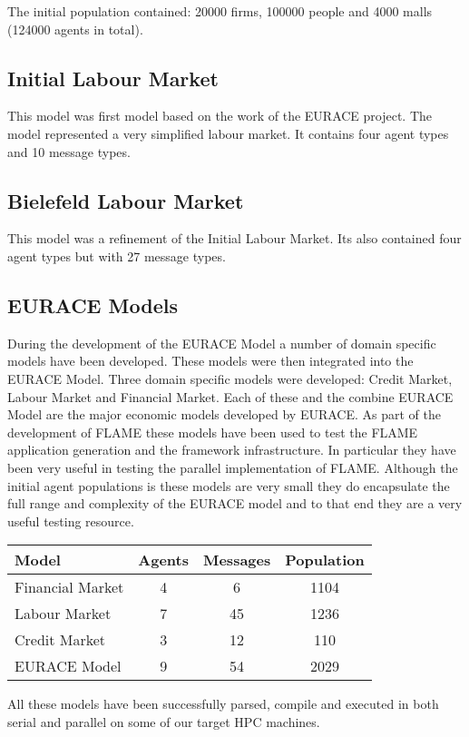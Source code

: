 The initial population contained: 20000 firms, 100000 people and 4000 malls (124000 agents in total).
\subsection{Initial Labour Market}
This model was first model based on the work of the EURACE project. The model represented a very simplified labour market. It contains four agent types and 10 message types.
\subsection{Bielefeld Labour Market}
This model was a refinement of the Initial Labour Market. Its also contained four agent types but with 27 message types.
\subsection{EURACE Models}
During the development of the EURACE Model a number of domain specific models have been developed. These models were then integrated into the EURACE Model. Three domain specific models were developed: Credit Market, Labour Market and Financial Market. Each of these and the combine EURACE Model are the major economic models developed by EURACE. As part of the development of FLAME these models have been used to test the FLAME application generation and the framework infrastructure. In particular they have been very useful in testing the parallel implementation of FLAME. Although the initial agent populations is these models are very small they do encapsulate the full range and complexity of the EURACE model and to that end they are a very useful testing resource.

\begin{table}[ht]
	\centering
		\begin{tabular}{l|ccc}
		Model & Agents & Messages & Population \\\hline
		Financial Market  &    4    &   6       &  1104          \\
		Labour Market   &   7     &    45      &   1236         \\
		Credit Market   &   3     &    12      &   110         \\ 
		EURACE Model    &   9     &    54       &  2029         \\\hline
		\end{tabular}
\end{table}

All these models have been successfully parsed, compile and executed in both serial and parallel on some of our target HPC machines.